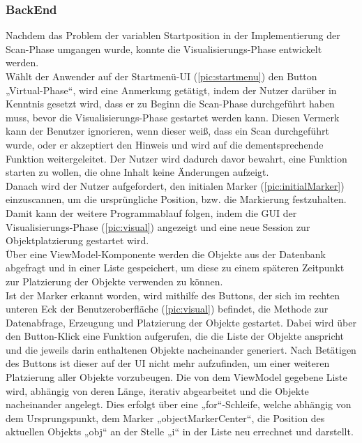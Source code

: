 \subsubsection{BackEnd}
Nachdem das Problem der variablen Startposition in der Implementierung der Scan-Phase umgangen wurde, konnte die Visualisierungs-Phase entwickelt werden. 
\\ 
\linebreak
Wählt der Anwender auf der Startmenü-\acs{UI} (\ref{pic:startmenu}) den Button „Virtual-Phase“, wird eine Anmerkung getätigt, indem der Nutzer darüber in 
Kenntnis gesetzt wird, dass er zu Beginn die Scan-Phase durchgeführt haben muss, bevor die Visualisierungs-Phase gestartet werden kann. Diesen Vermerk kann der 
Benutzer ignorieren, wenn dieser weiß, dass ein Scan durchgeführt wurde, oder er akzeptiert den Hinweis und wird auf die dementsprechende Funktion weitergeleitet. 
Der Nutzer wird dadurch davor bewahrt, eine Funktion starten zu wollen, die ohne Inhalt keine Änderungen aufzeigt.
\\ 
Danach wird der Nutzer aufgefordert, den initialen Marker (\ref{pic:initialMarker}) einzuscannen, um die ursprüngliche Position, bzw. die Markierung festzuhalten. 
Damit kann der weitere Programmablauf folgen, indem die \acs{GUI} der Visualisierungs-Phase (\ref{pic:visual}) angezeigt und eine neue Session zur 
Objektplatzierung gestartet wird. 
\\
Über eine ViewModel-Komponente werden die Objekte aus der Datenbank abgefragt und in einer Liste gespeichert, um diese zu einem späteren Zeitpunkt zur Platzierung der 
Objekte verwenden zu können. 
\\ 
Ist der Marker erkannt worden, wird mithilfe des Buttons, der sich im rechten unteren Eck der Benutzeroberfläche (\ref{pic:visual}) befindet, die Methode zur 
Datenabfrage, Erzeugung und Platzierung der Objekte gestartet. Dabei wird über den Button-Klick eine Funktion aufgerufen, die die Liste der Objekte anspricht und 
die jeweils darin enthaltenen Objekte nacheinander generiert. Nach Betätigen des Buttons ist dieser auf der \acs{UI} nicht mehr aufzufinden, um einer weiteren 
Platzierung aller Objekte vorzubeugen. Die von dem ViewModel gegebene Liste wird, abhängig von deren Länge, iterativ abgearbeitet und die Objekte 
nacheinander angelegt. Dies erfolgt über eine „for“-Schleife, welche abhängig von dem Ursprungspunkt, dem Marker „objectMarkerCenter“, die Position des 
aktuellen Objekts „obj“ an der Stelle „i“ in der Liste neu errechnet und darstellt.
\\ 
